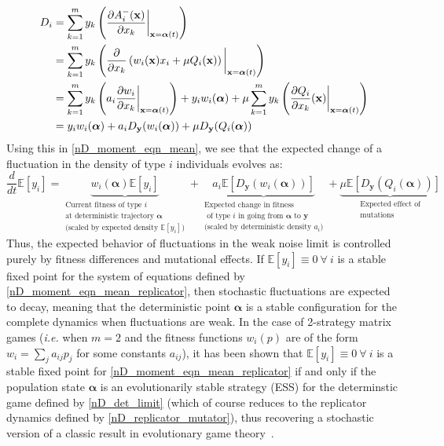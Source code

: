 \begin{align}
D_i &= \sum\limits_{k=1}^{m} y_k\left(\frac{\partial A^{-}_i(\mathbf{x})}{\partial x_k}\bigg{|}_{\mathbf{x}=\boldsymbol{\alpha}(t)}\right)\\
&= \sum\limits_{k=1}^{m} y_k\left(\frac{\partial}{\partial x_k}\left( w_i(\mathbf{x})x_i + \mu Q_i(\mathbf{x})\right)\bigg{|}_{\mathbf{x}=\boldsymbol{\alpha}(t)}\right)\\
&= \sum\limits_{k=1}^{m} y_k\left(a_i\frac{\partial w_i}{\partial x_k}\bigg{|}_{\mathbf{x}=\boldsymbol{\alpha}(t)}\right) + y_iw_i(\boldsymbol{\alpha}) + \mu\sum\limits_{k=1}^{m} y_k\left(\frac{\partial Q_i}{\partial x_k}(\mathbf{x})\bigg{|}_{\mathbf{x}=\boldsymbol{\alpha}(t)}\right)\\
&= y_iw_i(\boldsymbol{\alpha}) + a_iD_{\mathbf{y}}(w_i(\boldsymbol{\alpha})) + \mu D_{\mathbf{y}}(Q_i(\boldsymbol{\alpha}))\label{nD_WNA_directional_derivative_for_replicator_eqns}
\end{align}
Using this in \eqref{nD_moment_eqn_mean}, we see that the expected change of a fluctuation in the density of type $i$ individuals evolves as:
\begin{equation}
\label{nD_moment_eqn_mean_replicator}
\frac{d}{dt}\mathbb{E}[y_i] = \underbrace{w_i(\boldsymbol{\alpha})\mathbb{E}[y_i]}_{\substack{\text{Current fitness of type $i$} \\ \text{at deterministic trajectory $\boldsymbol{\alpha}$} \\ \text{(scaled by expected density $\mathbb{E}[y_i]$)}}} + \underbrace{a_i\mathbb{E}[D_{\mathbf{y}}(w_i(\boldsymbol{\alpha}))]}_{\substack{\text{Expected change in fitness} \\ \text{ of type $i$ in going from $\boldsymbol{\alpha}$ to $\mathbf{y}$} \\ \text{(scaled by deterministic density $a_i$)}}} + \underbrace{\mu\mathbb{E}[D_{\mathbf{y}}(Q_i(\boldsymbol{\alpha}))]}_{\substack{\text{Expected effect of} \\ \text{mutations}}}
\end{equation}
Thus, the expected behavior of fluctuations in the weak noise limit is controlled purely by fitness differences and mutational effects. If $\mathbb{E}[y_i] \equiv 0 \ \forall \ i$ is a stable fixed point for the system of equations defined by \eqref{nD_moment_eqn_mean_replicator}, then stochastic fluctuations are expected to decay, meaning that the deterministic point $\boldsymbol{\alpha}$ is a stable configuration for the complete dynamics when fluctuations are weak. In the case of 2-strategy matrix games (\emph{i.e.} when $m=2$ and the fitness functions $w_i(p)$ are of the form $w_i = \sum_j a_{ij}p_j$ for some constants $a_{ij}$), it has been shown that $\mathbb{E}[y_i] \equiv 0 \ \forall \ i$ is a stable fixed point for \eqref{nD_moment_eqn_mean_replicator} if and only if the population state $\boldsymbol{\alpha}$ is an evolutionarily stable strategy (ESS) for the determinstic game defined by \eqref{nD_det_limit} (which of course reduces to the replicator dynamics defined by \eqref{nD_replicator_mutator}), thus recovering a stochastic version of a classic result in evolutionary game theory~\citep{tao_stochastic_2007}.
